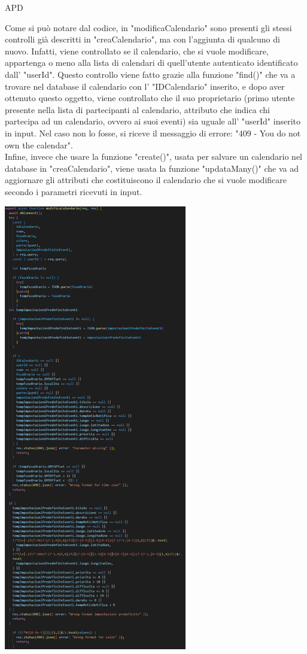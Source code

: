 \begin{listaPersonale} {APD}
\begin{listaPersonale2}[APD]{}
                Come si può notare dal codice, in "modificaCalendario" sono presenti gli stessi controlli già descritti in "creaCalendario", ma con l'aggiunta di qualcuno di nuovo. Infatti, viene controllato se il calendario, che si vuole modificare, appartenga o meno alla lista di calendari di quell'utente autenticato identificato dall' "userId". Questo controllo viene fatto grazie alla funzione "find()" che va a trovare nel database il calendario con l' "IDCalendario" inserito, e dopo aver ottenuto questo oggetto, viene controllato che il suo proprietario (primo utente presente nella lista di partecipanti al calendario, attributo che indica chi partecipa ad un calendario, ovvero ai suoi eventi) sia uguale all' "userId" inserito in input. Nel caso non lo fosse, si riceve il messaggio di errore: "409 - You do not own the calendar". \\
                Infine, invece che usare la funzione "create()", usata per salvare un calendario nel database in "creaCalendario", viene usata la funzione "updataMany()" che va ad aggiornare gli attributi che costituiscono il calendario che si vuole modificare secondo i parametri ricevuti in input.
                \begin{center}
                    \includegraphics[width=0.6\textwidth, height=0.9\textheight]{img/png/APIs/modificaCalendario.png}

\end{center}
\end{listaPersonale2}
\end{listaPersonale}
